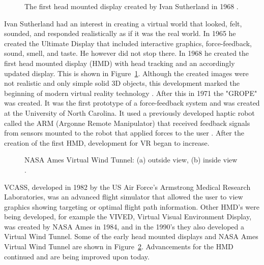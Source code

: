 \begin{figure}[!ht]
	\begin{center}
	\end{center}
	\caption{The first head mounted display created by Ivan Sutherland in 1968 \cite{Mazuryk}. } \label{fig:FirstHMD}
\end{figure}Ivan Sutherland had an interest in creating a virtual world that looked, felt, sounded, and responded realistically as if it was the real world. In 1965 he created the Ultimate Display that included interactive graphics, force-feedback, sound, smell, and taste. He however did not stop there. In 1968 he created the first head mounted display (HMD) with head tracking and an accordingly updated display. This is shown in Figure~\ref{fig:FirstHMD}. Although the created images were not realistic and only simple solid 3D objects, this development marked the beginning of modern virtual reality technology \cite{GutierrezA.2008}. After this in 1971 the "GROPE" was created. It was the first prototype of a force-feedback system and was created at the University of North Carolina. It used a previously developed haptic robot called the ARM (Argonne Remote Manipulator) that received feedback signals from sensors mounted to the robot that applied forces to the user \cite{GutierrezA.2008}. After the creation of the first HMD, development for VR began to increase. 
\begin{figure}[!ht]
	\begin{center}
	\end{center}
	\caption{NASA Ames Virtual Wind Tunnel: (a) outside view, (b) inside view \cite{Mazuryk}. } \label{fig:WindTunnelHMD}
\end{figure} VCASS, developed in 1982 by the US Air Force's Armstrong Medical Research Laboratories, was an advanced flight simulator that allowed the user to view graphics showing targeting or optimal flight path information. Other HMD's were being developed, for example the VIVED, Virtual Visual Environment Display, was created by NASA Ames in 1984, and in the 1990's they also developed a Virtual Wind Tunnel. Some of the early head mounted displays and NASA Ames Virtual Wind Tunnel are shown in Figure~\ref{fig:WindTunnelHMD}. Advancements for the HMD continued and are being improved upon today. 



